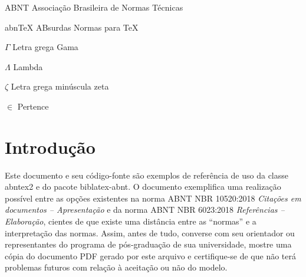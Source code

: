 \documentclass[
	12pt,				%
	openright,			%
	oneside,			%
	a4paper,			%
	english,			%
	brazil				%
	]{abntex2}
\begin{document}
\listoffigures*
\cleardoublepage

\listoftables*
\cleardoublepage


\begin{siglas}
  \item[ABNT] Associação Brasileira de Normas Técnicas
  \item[abnTeX] ABsurdas Normas para TeX
\end{siglas}

\begin{simbolos}
  \item[$ \Gamma $] Letra grega Gama
  \item[$ \Lambda $] Lambda
  \item[$ \zeta $] Letra grega minúscula zeta
  \item[$ \in $] Pertence
\end{simbolos}

\tableofcontents*
\cleardoublepage


\makeatletter
{}
\makeatother




\textual


\pagestyle{plain}


\chapter[Introdução]{Introdução}

Este documento e seu código-fonte são exemplos de referência de uso da classe \textsf{abntex2} e do pacote \textsf{biblatex-abnt}. O documento exemplifica uma realização possível entre as opções existentes na norma ABNT NBR 10520:2018 \emph{Citações em documentos -- Apresentação} e da norma ABNT NBR 6023:2018 \emph{Referências -- Elaboração}, cientes de que existe uma distância entre as ``normas'' e a interpretação das normas. Assim, antes de tudo, converse com seu orientador ou representantes do programa de pós-graduação de sua universidade, mostre uma cópia do documento PDF gerado por este arquivo e certifique-se de que não terá problemas futuros com relação à aceitação ou não do modelo.
\end{document}
